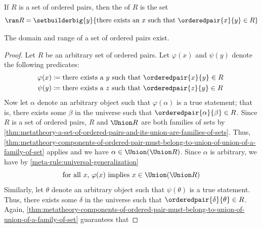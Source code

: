 \begin{dfn}[Range]
     \label{dfn:metatheory-range-of-a-set-of-ordered-pairs}
    If \( R \) is a set of ordered pairs, then the  of \( R \) is the set
    \begin{equation*}
        \ran R = \setbuilderbig{y}{\text{there exists an \( x \) such that \( \orderedpair{x}{y} \in R \)}}
    \end{equation*}
\end{dfn}

\begin{thm}
     \label{thm:metatheory-existence-of-domain-and-range-of-a-set-of-ordered-pairs}
    The domain and range of a set of ordered pairs exist.
\end{thm}

\begin{proof}
    Let \( R \) be an arbitrary set of ordered pairs. Let \( \varphi(x) \) and \( \psi(y) \) denote the following predicates:
    \begin{align*}
        \varphi(x) &\coloneq \text{there exists a \( y \) such that \( \orderedpair{x}{y} \in R \)}\\
        \psi(y)    &\coloneq \text{there exists a \( z \) such that \( \orderedpair{z}{y} \in R \) }
    \end{align*}
    Now let \( \alpha \) denote an arbitrary object such that \( \varphi(\alpha) \) is a true statement; that is, there exists some \( \beta \) in the universe
    such that \( \orderedpair{\alpha}{\beta} \in R \).
    Since \( R \) is a set of ordered pairs, \( R \) and \( \Union R \) are both families of sets by
    \cref{thm:metatheory-a-set-of-ordered-pairs-and-its-union-are-families-of-sets}.
    Thus, \cref{thm:metatheory-components-of-ordered-pair-must-belong-to-union-of-union-of-a-family-of-set} applies and we have
    \( \alpha \in \Union \mleft( \Union R \mright) \).
    Since \( \alpha \) is arbitrary, we have by \cref{meta-rule:universal-generalization}
    \begin{equation}
        \label{eq:varphi-x-implies-union-union-of-R}
        \text{for all \( x \), \( \varphi(x) \) implies \( x \in \Union \mleft( \Union R \mright) \)}
    \end{equation}
    Similarly, let \( \theta \) denote an arbitrary object such that \( \psi(\theta) \) is a true statement.
    Thus, there exists some \( \delta \) in the universe such that \( \orderedpair{\delta}{\theta} \in R \).
    Again, \cref{thm:metatheory-components-of-ordered-pair-must-belong-to-union-of-union-of-a-family-of-set} guarantees that

\end{proof}
